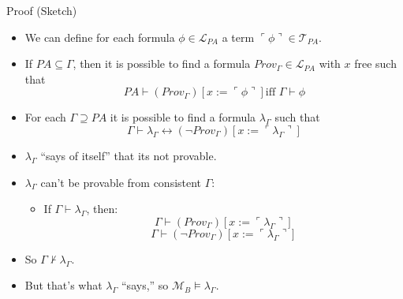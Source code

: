 \begin{frame}{Proof (Sketch)}

  \begin{itemize}
  \item We can define for each formula $\phi\in\mathcal{L}_{PA}$ a
    term $\ulcorner \phi\urcorner\in\mathcal{T}_{PA}$.
  \item If $PA\subseteq \Gamma$, then it is possible to find a formula
    $Prov_\Gamma\in\mathcal{L}_{PA}$ with $x$ free  such
    that \[PA\vdash (Prov_\Gamma)[x:=\ulcorner \phi\urcorner]\text{
        iff }\Gamma\vdash\phi\]
   \item For each $\Gamma\supseteq PA$ it is possible to find a formula
     $\lambda_\Gamma$ such that
     \[\Gamma\vdash \lambda_\Gamma
       \leftrightarrow (\neg
       Prov_\Gamma)[x:=\ulcorner \lambda_\Gamma\urcorner]\]

   \item $\lambda_\Gamma$ ``says of itself'' that its not provable.

   \item $\lambda_\Gamma$ can't be provable from consistent $\Gamma$:

     \begin{itemize}
     \item If $\Gamma\vdash \lambda_\Gamma$, then: \[\Gamma\vdash
       (Prov_\Gamma)[x:=\ulcorner\lambda_\Gamma\urcorner]\]\[\Gamma\vdash
       (\neg Prov_\Gamma)[x:=\ulcorner\lambda_\Gamma\urcorner]\] 
   \end{itemize}

 \item So $\Gamma\nvdash \lambda_\Gamma$.

   \item But that's what $\lambda_\Gamma$ ``says,'' so
     $\mathcal{M}_B\vDash \lambda_\Gamma$.
  \end{itemize}
  
\end{frame}

